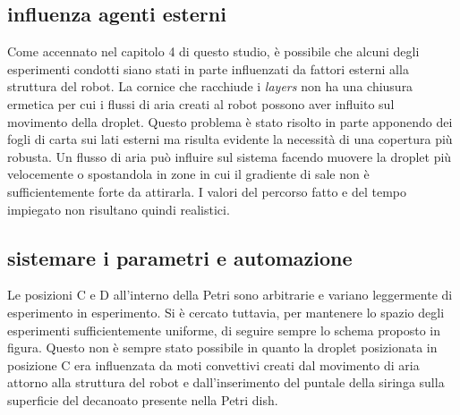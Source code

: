 \subsection{influenza agenti esterni}
Come accennato nel capitolo 4 di questo studio, è possibile che alcuni degli esperimenti condotti siano stati in parte influenzati da fattori esterni alla struttura del robot. La cornice che racchiude i \emph{layers} non ha una chiusura ermetica per cui i flussi di aria creati al robot possono aver influito sul movimento della droplet. Questo problema è stato risolto in parte apponendo dei fogli di carta sui lati esterni ma risulta evidente la necessità di una copertura più robusta. Un flusso di aria può influire sul sistema facendo muovere la droplet più velocemente o spostandola in zone in cui il gradiente di sale non è sufficientemente forte da attirarla. I valori del percorso fatto e del tempo impiegato non risultano quindi realistici.

 
 

\subsection{sistemare i parametri e automazione}

Le posizioni C e D all'interno della Petri sono arbitrarie e variano leggermente di esperimento in esperimento. Si è cercato tuttavia, per mantenere lo spazio degli esperimenti sufficientemente uniforme, di seguire sempre lo schema proposto in figura. Questo non è sempre stato possibile in quanto la droplet posizionata in posizione C era influenzata da moti convettivi creati dal movimento di aria attorno alla struttura del robot e dall'inserimento del puntale della siringa sulla superficie del decanoato presente nella Petri dish. 